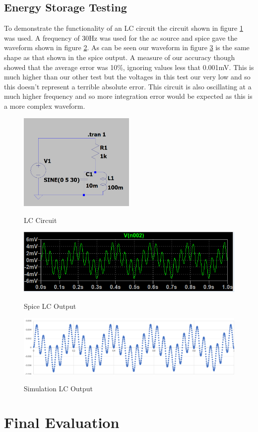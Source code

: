 \documentclass{article}
\begin{document}
\subsection{Energy Storage Testing}
To demonstrate the functionality of an LC circuit the circuit shown in figure \ref{fig:LCCircuit1} was used. A frequency of 30Hz was used for the ac source and spice gave the waveform shown in figure \ref{fig:LCSpice1}. As can be seen our waveform in figure \ref{fig:LCOutput1} is the same shape as that shown in the spice output. A measure of our accuracy though showed that the average error was 10\%, ignoring values less that 0.001mV. This is much higher than our other test but the voltages in this test our very low and so this doesn't represent a terrible absolute error. This circuit is also oscillating at a much higher frequency and so more integration error would be expected as this is a more complex waveform. 
\begin{figure}[h]
    \caption{LC Circuit}
    \centering
    \includegraphics[width=0.5\textwidth]{images/LCCircuit1.png}
    \label{fig:LCCircuit1}
\end{figure}
\begin{figure}[h]
    \caption{Spice LC Output}
    \centering
    \includegraphics[width=1\textwidth]{images/LCSpice1.png}
    \label{fig:LCSpice1}
\end{figure}
\begin{figure}[h]
    \caption{Simulation LC Output}
    \centering
    \includegraphics[width=1\textwidth]{images/LCOutput1.png}
    \label{fig:LCOutput1}
\end{figure}
\section{Final Evaluation}

\newpage





\end{document}
